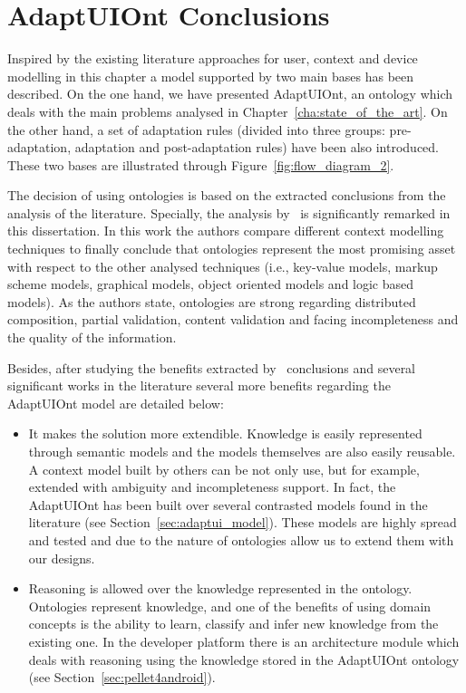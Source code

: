 \section{AdaptUIOnt Conclusions}
\label{sec:adaptui_conclusions}

Inspired by the existing literature approaches for user, context and device
modelling in this chapter a model supported by two main bases has been described.
On the one hand, we have presented AdaptUIOnt, an ontology which deals with the
main problems analysed in Chapter~\ref{cha:state_of_the_art}. On the other hand,
a set of adaptation rules (divided into three groups: pre-adaptation, adaptation
and post-adaptation rules) have been also introduced. These two bases are
illustrated through Figure~\ref{fig:flow_diagram_2}.

The decision of using ontologies is based on the extracted conclusions from the
analysis of the literature. Specially, the analysis by~\citet{strang_context_2004}
is significantly remarked in this dissertation. In this work the authors compare
different context modelling techniques to finally conclude that ontologies
represent the most promising asset with respect to the other analysed techniques
(i.e., key-value models, markup scheme models, graphical models, object oriented
models and logic based models). As the authors state, ontologies are strong
regarding distributed composition, partial validation, content validation
and facing incompleteness and the quality of the information.

Besides, after studying the benefits extracted by~\citeauthor{strang_context_2004}
conclusions and several significant works in the literature several more benefits
regarding the AdaptUIOnt model are detailed below:

\begin{itemize}
  \item It makes the solution more extendible. Knowledge is easily represented
  through semantic models and the models themselves are also easily reusable.
  A context model built by others can be not only use, but for example, extended
  with ambiguity and incompleteness support. In fact, the AdaptUIOnt has been
  built over several contrasted models found in the literature (see
  Section~\ref{sec:adaptui_model}). These models are highly spread and tested
  and due to the nature of ontologies allow us to extend them with our designs.
  
  \item Reasoning is allowed over the knowledge represented in the ontology.
  Ontologies represent knowledge, and one of the benefits of using domain
  concepts is the ability to learn, classify and infer new knowledge from the
  existing one. In the developer platform there is an architecture module which
  deals with reasoning using the knowledge stored in the AdaptUIOnt ontology
  (see Section~\ref{sec:pellet4android}).
\end{itemize}


